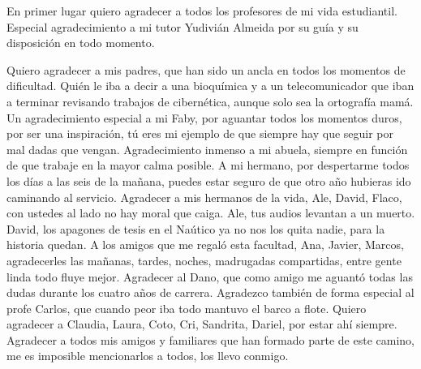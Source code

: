 \begin{acknowledgements}
    En primer lugar quiero agradecer a todos los profesores de mi vida estudiantil. Especial agradecimiento a mi 
tutor Yudivián Almeida por su guía y su disposición en todo momento.

    Quiero agradecer a mis padres, que han sido un ancla en todos los momentos de dificultad. Quién le iba a decir a 
una bioquímica y a un telecomunicador que iban a terminar revisando trabajos de cibernética, aunque solo sea la 
ortografía mamá. Un agradecimiento especial a mi Faby, por aguantar todos los momentos duros, por ser una inspiración, 
tú eres mi ejemplo de que siempre hay que seguir por mal dadas que vengan. Agradecimiento inmenso a mi abuela, siempre en función 
de que trabaje en la mayor calma posible. A mi hermano, por despertarme todos los días a las seis de la mañana, puedes 
estar seguro de que otro año hubieras ido caminando al servicio. Agradecer a mis hermanos de la vida, Ale, David, Flaco, 
con ustedes al lado no hay moral que caiga. Ale, tus audios levantan a un muerto. David, los apagones de tesis en el 
Naútico ya no nos los quita nadie, para la historia quedan. A los amigos que me regaló esta facultad, Ana, Javier, Marcos, 
agradecerles las mañanas, tardes, noches, madrugadas compartidas, entre gente linda todo fluye mejor. Agradecer al Dano, que como 
amigo me aguantó todas las dudas durante los cuatro años de carrera. Agradezco también de forma especial al profe Carlos, que cuando 
peor iba todo mantuvo el barco a flote. Quiero agradecer a Claudia, Laura, Coto, Cri, Sandrita, Dariel, por estar ahí siempre.
Agradecer a todos mis amigos y familiares que han formado parte de este camino, me es imposible mencionarlos a todos, 
los llevo conmigo. 
\end{acknowledgements}